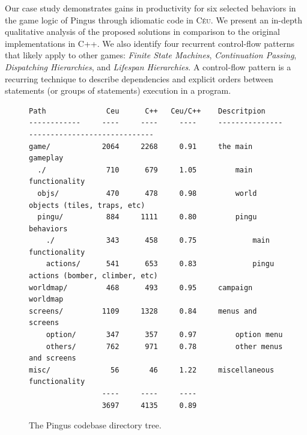 \documentclass{vgtc}                          %
\newcommand{\CEU}{\textsc{C\'{e}u}\xspace}
\begin{document}
Our case study demonstrates gains in productivity for six selected behaviors in
the game logic of Pingus through idiomatic code in \CEU.
We present an in-depth qualitative analysis of the proposed solutions in
comparison to the original implementations in C++.
We also identify four recurrent control-flow patterns that likely apply to
other games:
        \emph{Finite State Machines},
        \emph{Continuation Passing},
        \emph{Dispatching Hierarchies}, and
        \emph{Lifespan Hierarchies}.
%
A control-flow pattern is a recurring technique to describe dependencies and
explicit orders between statements (or groups of statements) execution in a
program.

\begin{figure}[t]
\begin{verbatim}
Path              Ceu      C++   Ceu/C++    Descritpion
------------     ----     ----     ----     --------------------------------------------
game/            2064     2268     0.91     the main gameplay
  ./              710      679     1.05         main functionality
  objs/           470      478     0.98         world objects (tiles, traps, etc)
  pingu/          884     1111     0.80         pingu behaviors
    ./            343      458     0.75             main functionality
    actions/      541      653     0.83             pingu actions (bomber, climber, etc)
worldmap/         468      493     0.95     campaign worldmap
screens/         1109     1328     0.84     menus and screens
    option/       347      357     0.97         option menu
    others/       762      971     0.78         other menus and screens
misc/              56       46     1.22     miscellaneous functionality
                 ----     ----     ----
                 3697     4135     0.89
\end{verbatim}
\caption{The Pingus codebase directory tree.
\label{tab.tree}
}
\end{figure}
\end{document}

